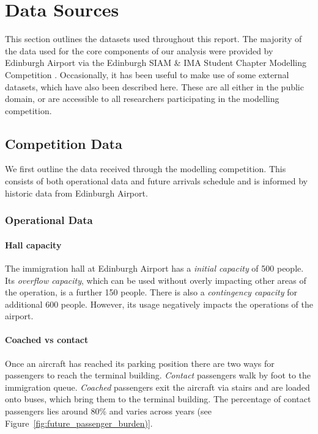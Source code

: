 \documentclass[10pt]{article}
\begin{document}
\section{Data Sources}
This section outlines the datasets used throughout this report. The majority of the data used for the core components of our analysis were provided by Edinburgh Airport via the Edinburgh SIAM \& IMA Student Chapter Modelling Competition \cite{modelling_competition}. Occasionally, it has been useful to make use of some external datasets, which have also been described here. These are all either in the public domain, or are accessible to all researchers participating in the modelling competition. 

\subsection{Competition Data}

We first outline the data received through the modelling competition. This consists of both operational data and future arrivals schedule and is informed by historic data from Edinburgh Airport.


\subsubsection{Operational Data}

\paragraph{Hall capacity}
The immigration hall at Edinburgh Airport has a \textit{initial capacity} of 500 people. Its \textit{overflow capacity}, which can be used without overly impacting other areas of the operation, is a further 150 people. There is also a \textit{contingency capacity} for additional 600 people. However, its usage negatively impacts the operations of the airport.

\paragraph{Coached vs contact}
Once an aircraft has reached its parking position there are two ways for passengers to reach the terminal building. \textit{Contact} passengers walk by foot to the immigration queue. \textit{Coached} passengers exit the aircraft via stairs and are loaded onto buses, which bring them to the terminal building. The percentage of contact passengers lies around 80\% and varies across years (see Figure~\ref{fig:future_passenger_burden)}.
\end{document}
